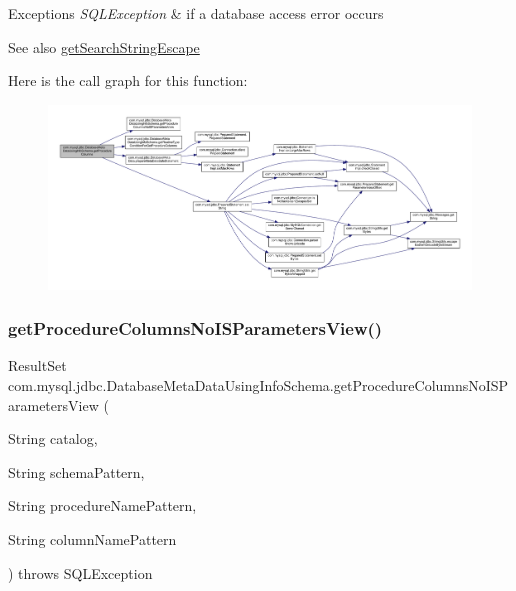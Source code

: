\begin{DoxyExceptions}{Exceptions}
{\em S\+Q\+L\+Exception} & if a database access error occurs \\
\hline
\end{DoxyExceptions}
\begin{DoxySeeAlso}{See also}
\mbox{\hyperlink{classcom_1_1mysql_1_1jdbc_1_1_database_meta_data_a210b7942557a965c3af550074bb6fe9d}{get\+Search\+String\+Escape}} 
\end{DoxySeeAlso}
Here is the call graph for this function\+:
\nopagebreak
\begin{figure}[H]
\begin{center}
\leavevmode
\includegraphics[width=350pt]{classcom_1_1mysql_1_1jdbc_1_1_database_meta_data_using_info_schema_a2bb17e6501848d501ed65ee886ed4225_cgraph}
\end{center}
\end{figure}
\mbox{\label{classcom_1_1mysql_1_1jdbc_1_1_database_meta_data_using_info_schema_a39f4d86800a2ecfb0e22a88485a92aae}} 
\subsubsection{\texorpdfstring{get\+Procedure\+Columns\+No\+I\+S\+Parameters\+View()}{getProcedureColumnsNoISParametersView()}}
{\footnotesize\ttfamily Result\+Set com.\+mysql.\+jdbc.\+Database\+Meta\+Data\+Using\+Info\+Schema.\+get\+Procedure\+Columns\+No\+I\+S\+Parameters\+View (\begin{DoxyParamCaption}\item[{String}]{catalog,  }\item[{String}]{schema\+Pattern,  }\item[{String}]{procedure\+Name\+Pattern,  }\item[{String}]{column\+Name\+Pattern }\end{DoxyParamCaption}) throws S\+Q\+L\+Exception\hspace{0.3cm}{\ttfamily [protected]}}

